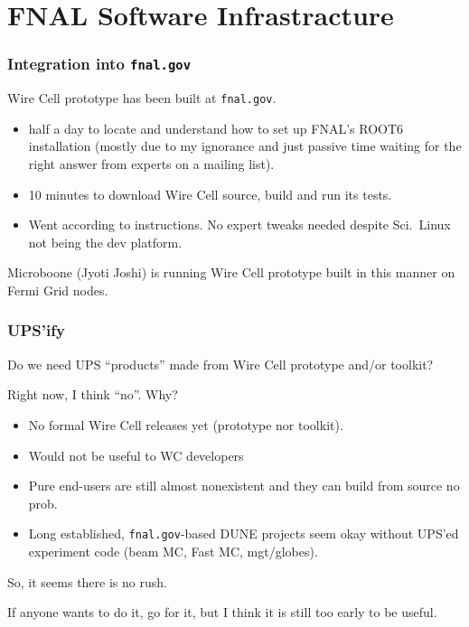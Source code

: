 \documentclass[xcolor=dvipsnames]{beamer}
\begin{document}
\section{FNAL Software Infrastracture}

\begin{frame}
\end{frame}

\begin{frame}
  \frametitle{Integration into \texttt{fnal.gov}}
  Wire Cell prototype has been built at \texttt{fnal.gov}.
  \begin{itemize}\footnotesize
  \item half a day to locate and understand how to set up FNAL's ROOT6
    installation (mostly due to my ignorance and just passive time
    waiting for the right answer from experts on a mailing list).
  \item 10 minutes to download Wire Cell source, build and run its tests.
  \item Went according to instructions.  No expert tweaks needed despite Sci.~Linux not being the dev platform.
  \end{itemize}

  Microboone (Jyoti Joshi) is running Wire Cell prototype built in this manner on Fermi Grid nodes.
\end{frame}

\begin{frame}
  \frametitle{UPS'ify}
  Do we need UPS ``products'' made from Wire Cell prototype and/or toolkit?

  \vspace{3mm}

  Right now, I think ``no''.  Why?

  \begin{itemize}
  \item No formal Wire Cell releases yet (prototype nor toolkit).
  \item Would not be useful to WC developers
  \item Pure end-users are still almost nonexistent and they can build
    from source no prob.
  \item Long established, \texttt{fnal.gov}-based DUNE projects seem
    okay without UPS'ed experiment code (beam MC, Fast MC,
    mgt/globes).
  \end{itemize}

  So, it seems there is no rush.

  \vspace{3mm}

  If anyone wants to do it, go for it, but I think it is still too early to be useful.

\end{frame}
\end{document}
